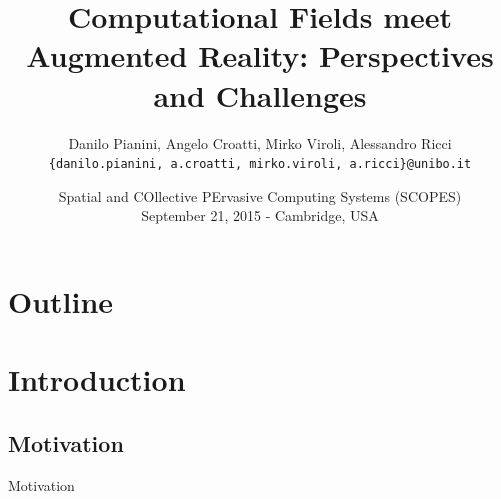 \documentclass[presentation]{beamer} %
\title[Computational Fields and Augmented Reality]{Computational Fields meet Augmented Reality: Perspectives and Challenges}
\author[Pianini et. al]{
Danilo Pianini, Angelo Croatti, Mirko Viroli, Alessandro Ricci\\
\texttt{{\footnotesize \{danilo.pianini, a.croatti, mirko.viroli, a.ricci\}@unibo.it}}}
\institute[UniBo]
{\textsc{Alma Mater Studiorum}---Universit\`a di Bologna a Cesena}
\date[2015-09-21 SCOPES]{Spatial and COllective PErvasive Computing Systems (SCOPES)\\
\scriptsize September 21, 2015 - Cambridge, USA
}
\begin{document}
\frame[label=coverpage]{\titlepage}

\section*{Outline}
\frame{\tableofcontents}

\section{Introduction}

\subsection{Motivation}
\begin{frame}{Motivation}
\end{frame}


\end{document}
